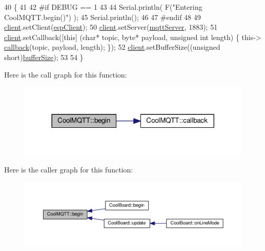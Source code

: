 \begin{DoxyCode}
40 \{ 
41 
42 \textcolor{preprocessor}{#if DEBUG == 1 }
43 
44     Serial.println( F(\textcolor{stringliteral}{"Entering CoolMQTT.begin()"}) );
45     Serial.println();
46 
47 \textcolor{preprocessor}{#endif}
48 
49     \hyperlink{classCoolMQTT_a4ca71e4f76ef868692a297efd45b1415}{client}.setClient(\hyperlink{classCoolMQTT_acc30a0200967374a524092a8a806502a}{espClient});
50     \hyperlink{classCoolMQTT_a4ca71e4f76ef868692a297efd45b1415}{client}.setServer(\hyperlink{classCoolMQTT_ab8bb951f87ddbf92db74c2ad16a3e53e}{mqttServer}, 1883); 
51     \hyperlink{classCoolMQTT_a4ca71e4f76ef868692a297efd45b1415}{client}.setCallback([\textcolor{keyword}{this}] (\textcolor{keywordtype}{char}* topic, byte* payload, \textcolor{keywordtype}{unsigned} \textcolor{keywordtype}{int} length) \{ this->
      \hyperlink{classCoolMQTT_a30d82ad665bfb603f46ecdbc290775df}{callback}(topic, payload, length); \});
52     \hyperlink{classCoolMQTT_a4ca71e4f76ef868692a297efd45b1415}{client}.setBufferSize((\textcolor{keywordtype}{unsigned} \textcolor{keywordtype}{short})\hyperlink{classCoolMQTT_a7f3cf26b51d6770f216e42c5ef13ca9f}{bufferSize});
53 
54 \}
\end{DoxyCode}
Here is the call graph for this function\+:
\nopagebreak
\begin{figure}[H]
\begin{center}
\leavevmode
\includegraphics[width=317pt]{classCoolMQTT_ac9248808641ebf3054ed0620ea9d0100_cgraph}
\end{center}
\end{figure}
Here is the caller graph for this function\+:
\nopagebreak
\begin{figure}[H]
\begin{center}
\leavevmode
\includegraphics[width=350pt]{classCoolMQTT_ac9248808641ebf3054ed0620ea9d0100_icgraph}
\end{center}
\end{figure}
\mbox{\label{classCoolMQTT_a30d82ad665bfb603f46ecdbc290775df}} 
